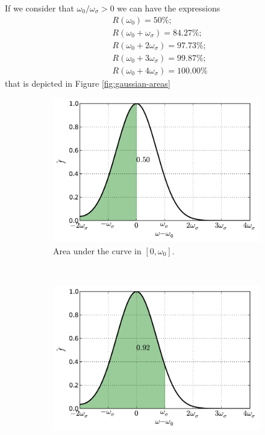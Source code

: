 \documentclass[12pt,letterpaper]{article}
\begin{document}
{If we consider that \(\omega_0/\omega_\sigma >0\) we can have the expressions
\begin{align*}
    &R(\omega_0) = 50\%;\\
    &R(\omega_0 + \omega_\sigma) = 84.27\%;\\
    &R(\omega_0 + 2\omega_\sigma) = 97.73\%;\\
    &R(\omega_0 + 3\omega_\sigma)= 99.87\%;\\
    &R(\omega_0 + 4\omega_\sigma) = 100.00\%
\end{align*}
that is depicted in Figure \ref{fig:gaussian-areas}
\begin{figure}[H]
    \centering
    \begin{subfigure}[b]{0.45\textwidth}
        \includegraphics[width=\textwidth]{img/gaussian_area=1.pdf}
        \caption{Area under the curve in $[0,\omega_0]$.}
    \end{subfigure}\
    \begin{subfigure}[b]{0.45\textwidth}
        \includegraphics[width=\textwidth]{img/gaussian_area=2.pdf}

\end{subfigure}
\end{figure}}
\end{document}

